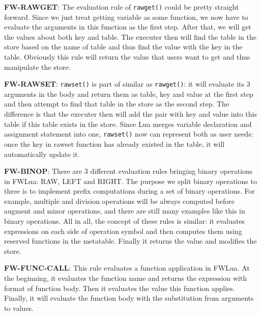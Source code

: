 \documentclass{article}
\begin{document}
{\bf FW-RAWGET}: The evaluation rule of {\tt rawget()} could be pretty straight forward. Since we just treat getting variable as some function, we now have to evaluate the arguments in this function as the first step. After that, we will get the values about both key and table. The executer then will find the table in the store based on the name of table and thus find the value with the key in the table. Obviously this rule will return the value that users want to get and thus manipulate the store.

{\bf FW-RAWSET}: {\tt rawset()} is part of similar as {\tt rawget()}: it will evaluate its 3 arguments in the body and return them as table, key and value at the first step and then attempt to find that table in the store as the second step. The difference is that the executer then will add the pair with key and value into this table if this table exists in the store. Since Lua merges variable declaration and assignment statement into one, {\tt rawset()} now can represent both as user needs: once the key in rawset function has already existed in the table, it will automatically update it.

{\bf FW-BINOP}: There are 3 different evaluation rules bringing binary operations in FWLua: RAW, LEFT and RIGHT. The purpose we split binary operations to three is to implement prefix computations during a set of binary operations. For example, multiple and division operations will be always computed before augment and minor operations, and there are still many examples like this in binary operations. All in all, the concept of these rules is similar: it evaluates expressions on each side of operation symbol and then computes them using reserved functions in the metatable. Finally it returns the value and modifies the store. 

{\bf FW-FUNC-CALL}: This rule evaluates a function application in FWLua. At the beginning, it evaluates the function name and returns the expression with format of function body. Then it evaluates the value this function applies. Finally, it will evaluate the function body with the substitution from arguments to values. 
\end{document}
